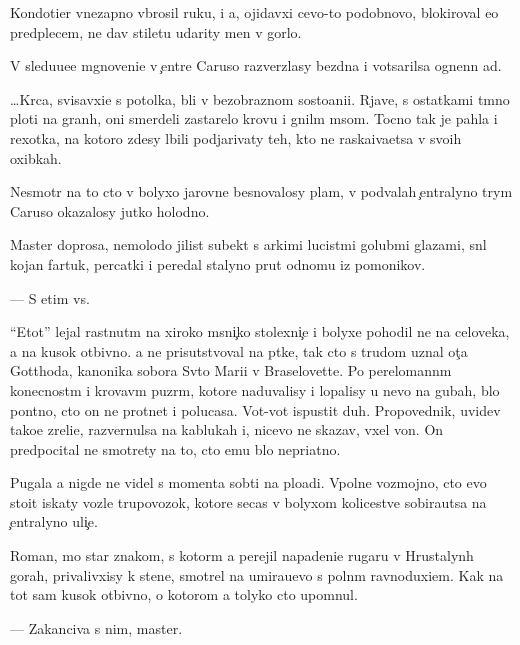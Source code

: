 \documentclass[10pt]{book}
\begin{document}
Kondotier vnezapno v{\yi}brosil ruku, i {\y}a, ojidavxi{\y} cevo-to podobnovo, bloki\-ro\-val {\y}e{\y}o predplec{\y}em, ne dav stiletu udarity men{\ia} v gorlo.

V sledu{\y}u{\x}e{\y}e mgnoveni{\y}e v {\c}entre Caruso razverzlasy bezdna i votsarilsa ognen\-n{\yi}{\y} ad.



…Kr{\io}c{\y}a, svisavxi{\y}e s potolka, b{\yi}li v bezobraznom sosto{\y}ani{\y}i. Rjav{\yi}{\y}e, s ostatkami t{\e}mno{\y} ploti na gran{\ia}h, oni smerdeli zastarelo{\y} krov{\y}u i gnil{\yi}m m{\ia}som. Tocno tak je pahla i rexotka, na kotoro{\y} zdesy l{\io}bili podjarivaty teh, kto ne raska{\y}iva{\y}etsa v svo{\y}ih oxibkah.

Nesmotr{\ia} na to cto v bolyxo{\y} jarovne besnovalosy plam{\ia}, v podvalah {\c}entralyno{\y} t{\io}rym{\yi} Caruso okazalosy jutko holodno.

Master doprosa, nemolodo{\y} jilist{\yi}{\y} sub{\y}ekt s {\y}arkimi lucist{\yi}mi golub{\yi}mi glaza\-mi, sn{\ia}l kojan{\yi}{\y} fartuk, percatki i peredal stalyno{\y} prut odnomu iz pomo{\x}nikov.

— S etim vs{\e}.

``Etot'' lejal rast{\ia}nut{\yi}m na xiroko{\y} m{\ia}sni{\c}ko{\y} stolexni{\c}e i bolyxe pohodil ne na celoveka, a na kusok otbivno{\y}. {\Y}a ne prisutstvoval na p{\yi}tke, tak cto s trudom uznal ot{\c}a Gotthoda, kanonika sobora Sv{\ia}to{\y} Mari{\y}i v Braselovette. Po perelomann{\yi}m konecnost{\ia}m i krovav{\yi}m puz{\yi}r{\ia}m, ko\-to\-r{\yi}\-{\y}e naduvalisy i lopalisy u nevo na gubah, b{\yi}lo pon{\ia}tno, cto on ne prot{\ia}net i polucasa. Vot-vot ispustit duh. Pro\-po\-ved\-nik, uvidev tako{\y}e zreli{\x}e, razvernulsa na kablukah i, nicevo ne skazav, v{\yi}xel von. On predpocital ne smotrety na to, cto {\y}emu b{\yi}lo nepri{\y}atno.

Pugala {\y}a nigde ne videl s momenta sob{\yi}ti{\y} na plo{\x}adi. Vpolne vozmojno, cto {\y}evo stoit iskaty voz\-le trupovozok, ko\-to\-r{\yi}\-{\y}e se{\y}cas v bolyxom kolicestve sobira{\y}utsa na {\c}entralyno{\y} uli{\c}e.

Roman, mo{\y} star{\yi}{\y} znakom{\yi}{\y}, s kotor{\yi}m {\y}a perejil napadeni{\y}e rugaru v Hrus\-taly\-n{\yi}h gorah, privalivxisy k stene, smotrel na umira{\y}u{\x}evo s poln{\yi}m ravno\-duxi\-{\y}em. Kak na tot sam{\yi}{\y} kusok otbivno{\y}, o kotorom {\y}a tolyko cto upom{\ia}nul.

— Zakanciva{\y} s nim, master.
\end{document}
